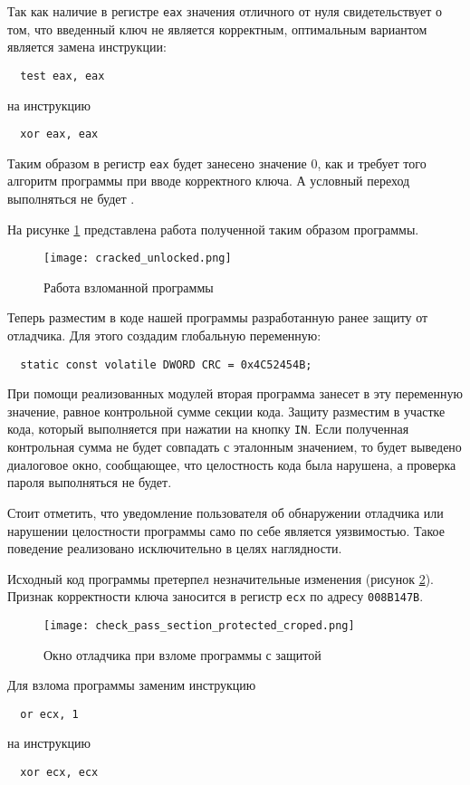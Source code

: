 Так как наличие в регистре \verb!eax! значения отличного от нуля свидетельствует
о том, что введенный ключ не является корректным, оптимальным вариантом является
замена инструкции:
\begin{verbatim}
  test eax, eax
\end{verbatim}
на инструкцию
\begin{verbatim}
  xor eax, eax
\end{verbatim}
Таким образом в регистр \verb!eax! будет занесено значение 0, как и требует того
алгоритм программы при вводе корректного ключа. А условный переход выполняться
не будет .


На рисунке \ref{fig:cracked_unlock} представлена работа полученной таким образом
программы.
\begin{figure}[htpb]
  \centering
  \texttt{[image: cracked\_unlocked.png]}
  \caption{Работа взломанной программы}
  \label{fig:cracked_unlock}
\end{figure}

Теперь разместим в коде нашей программы разработанную ранее защиту от отладчика. 
Для этого создадим глобальную переменную:
\begin{verbatim}
  static const volatile DWORD CRC = 0x4C52454B;
\end{verbatim}
При помощи реализованных модулей вторая программа занесет в эту переменную
значение, равное контрольной сумме секции кода. Защиту разместим в участке кода,
который выполняется при нажатии на кнопку \verb!IN!. Если полученная контрольная
сумма не будет совпадать с эталонным значением, то будет выведено диалоговое
окно, сообщающее, что целостность кода была нарушена, а проверка пароля
выполняться не будет.

Стоит отметить, что уведомление пользователя об обнаружении отладчика или
нарушении целостности программы само по себе является уязвимостью. Такое
поведение реализовано исключительно в целях наглядности.

Исходный код программы претерпел незначительные изменения (рисунок
\ref{fig:protected_code}). Признак корректности ключа заносится в регистр
\verb!ecx! по адресу \verb!008B147B!.

\begin{figure}[htpb]
  \centering
  \texttt{[image: check\_pass\_section\_protected\_croped.png]}
  \caption{Окно отладчика при взломе программы с защитой}
  \label{fig:protected_code}
\end{figure}

Для взлома программы заменим инструкцию
\begin{verbatim}
  or ecx, 1
\end{verbatim}
на инструкцию
\begin{verbatim}
  xor ecx, ecx  
\end{verbatim}

